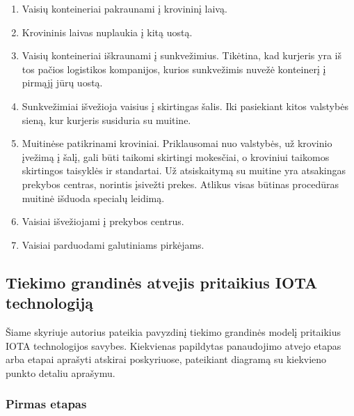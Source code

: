 \begin{enumerate}
    \item Vaisių konteineriai pakraunami į krovininį laivą.
    \item Krovininis laivas nuplaukia į kitą uostą.
    \item Vaisių konteineriai iškraunami į sunkvežimius. Tikėtina, kad kurjeris yra iš tos pačios logistikos kompanijos, kurios sunkvežimis nuvežė konteinerį į pirmąjį jūrų uostą.
    \item Sunkvežimiai išvežioja vaisius į skirtingas šalis. Iki pasiekiant kitos valstybės sieną, kur kurjeris susiduria su muitine.
    \item Muitinėse patikrinami kroviniai. Priklausomai nuo valstybės, už krovinio įvežimą į šalį, gali būti taikomi skirtingi mokesčiai, o kroviniui taikomos skirtingos taisyklės ir standartai. Už atsiskaitymą su muitine yra atsakingas prekybos centras, norintis įsivežti prekes. Atlikus visas būtinas procedūras muitinė išduoda specialų leidimą.
    \item Vaisiai išvežiojami į prekybos centrus.
    \item Vaisiai parduodami galutiniams pirkėjams.
\end{enumerate}




\subsection{Tiekimo grandinės atvejis pritaikius IOTA technologiją}

Šiame skyriuje autorius pateikia pavyzdinį tiekimo grandinės modelį pritaikius IOTA technologijos savybes. Kiekvienas papildytas panaudojimo atvejo etapas arba etapai aprašyti atskirai poskyriuose, pateikiant diagramą su kiekvieno punkto detaliu aprašymu.




\subsubsection{Pirmas etapas}

